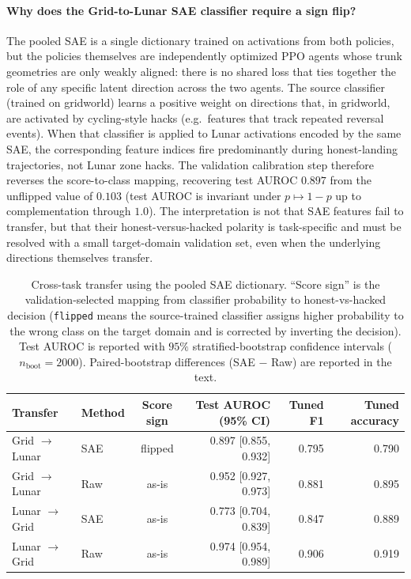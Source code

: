 \documentclass[11pt]{article}
\newcommand{\auroc}{AUROC}
\newcommand{\fone}{F1}
\newcommand{\code}[1]{\texttt{#1}}
\begin{document}
\paragraph{Why does the Grid-to-Lunar SAE classifier require a sign flip?}
The pooled SAE is a single dictionary trained on activations from both policies, but the policies themselves are independently optimized PPO agents whose trunk geometries are only weakly aligned: there is no shared loss that ties together the role of any specific latent direction across the two agents. The source classifier (trained on gridworld) learns a positive weight on directions that, in gridworld, are activated by cycling-style hacks (e.g.\ features that track repeated reversal events). When that classifier is applied to Lunar activations encoded by the same SAE, the corresponding feature indices fire predominantly during honest-landing trajectories, not Lunar zone hacks. The validation calibration step therefore reverses the score-to-class mapping, recovering test \auroc{} $0.897$ from the unflipped value of $0.103$ (test AUROC is invariant under $p \mapsto 1-p$ up to complementation through $1.0$). The interpretation is not that SAE features fail to transfer, but that their honest-versus-hacked polarity is task-specific and must be resolved with a small target-domain validation set, even when the underlying directions themselves transfer.

\begin{table}[H]
\centering
\caption{Cross-task transfer using the pooled SAE dictionary. ``Score sign'' is the validation-selected mapping from classifier probability to honest-vs-hacked decision (\code{flipped} means the source-trained classifier assigns higher probability to the wrong class on the target domain and is corrected by inverting the decision). Test \auroc{} is reported with $95\%$ stratified-bootstrap confidence intervals ($n_{\text{boot}}=2000$). Paired-bootstrap differences (SAE $-$ Raw) are reported in the text.}
\label{tab:crosstask}
\begin{tabular}{llcrrr}
\toprule
Transfer & Method & Score sign & Test \auroc{} (95\% CI) & Tuned \fone{} & Tuned accuracy\\
\midrule
Grid $\rightarrow$ Lunar & SAE & flipped & 0.897 [0.855, 0.932] & 0.795 & 0.790\\
Grid $\rightarrow$ Lunar & Raw & as-is   & 0.952 [0.927, 0.973] & 0.881 & 0.895\\
Lunar $\rightarrow$ Grid & SAE & as-is   & 0.773 [0.704, 0.839] & 0.847 & 0.889\\
Lunar $\rightarrow$ Grid & Raw & as-is   & 0.974 [0.954, 0.989] & 0.906 & 0.919\\
\bottomrule
\end{tabular}
\end{table}
\end{document}
